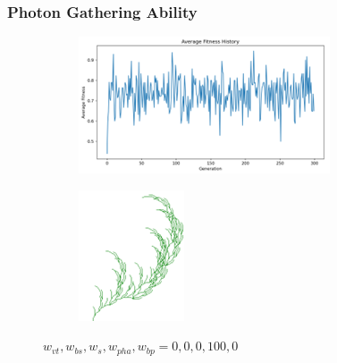 \subsubsection{Photon Gathering Ability}
\begin{figure}[H]
    \centering
    \begin{subfigure}[b]{0.3\textwidth}
        \includegraphics[width=\textwidth]{pg_only.png}
    \end{subfigure}
    \begin{subfigure}[b]{0.1\textwidth}
        \includegraphics[width=\textwidth]{pg_only_dr.png}
    \end{subfigure}

    \vspace{0.5cm}
    \caption{$w_{vt}, w_{bs}, w_{s}, w_{pha}, w_{bp} = 0, 0, 0, 100, 0$}
    \label{fig:subfigures}
\end{figure}

